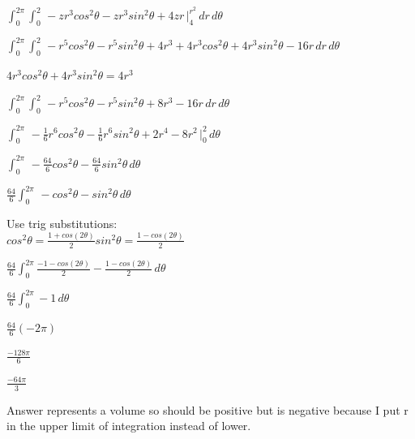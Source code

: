\documentclass[12pt]{amsart}
\begin{document}
$ \int_{0}^{2\pi} \int_{0}^{2} \, -zr^3cos^2\theta - zr^3sin^2\theta + 4zr \, \big|_4^{r^2} \, dr \, d\theta$

$ \int_{0}^{2\pi} \int_{0}^{2} \, -r^5cos^2\theta - r^5sin^2\theta + 4r^3 + 4r^3cos^2\theta + 4r^3sin^2\theta - 16r  \, dr \, d\theta$

$4r^3cos^2\theta + 4r^3sin^2\theta = 4r^3$

$ \int_{0}^{2\pi} \int_{0}^{2} \, -r^5cos^2\theta - r^5sin^2\theta + 8r^3 - 16r  \, dr \, d\theta$

$ \int_{0}^{2\pi} \, -\frac{1}{6}r^6cos^2\theta - \frac{1}{6}r^6sin^2\theta + 2r^4 - 8r^2  \, \big|_0^2 \, d\theta$

$ \int_{0}^{2\pi} \, -\frac{64}{6}cos^2\theta - \frac{64}{6}sin^2\theta  \, d\theta$

$ \frac{64}{6}\int_{0}^{2\pi} \, -cos^2\theta - sin^2\theta  \, d\theta$

Use trig substitutions: \\
$cos^2\theta = \frac{1+cos(2\theta)}{2}
sin^2\theta = \frac{1-cos(2\theta)}{2}$

$\frac{64}{6} \int_{0}^{2\pi} \frac{-1-cos(2\theta)}{2} - \frac{1-cos(2\theta)}{2} \, d\theta$ 

$\frac{64}{6} \int_{0}^{2\pi} -1 \, d\theta$ 

$\frac{64}{6} (-2\pi)$ 

$\frac{-128\pi}{6}$

$\frac{-64\pi}{3}$

Answer represents a volume so should be positive but is negative because I put r in the upper limit of integration instead of lower. 
\end{document}
